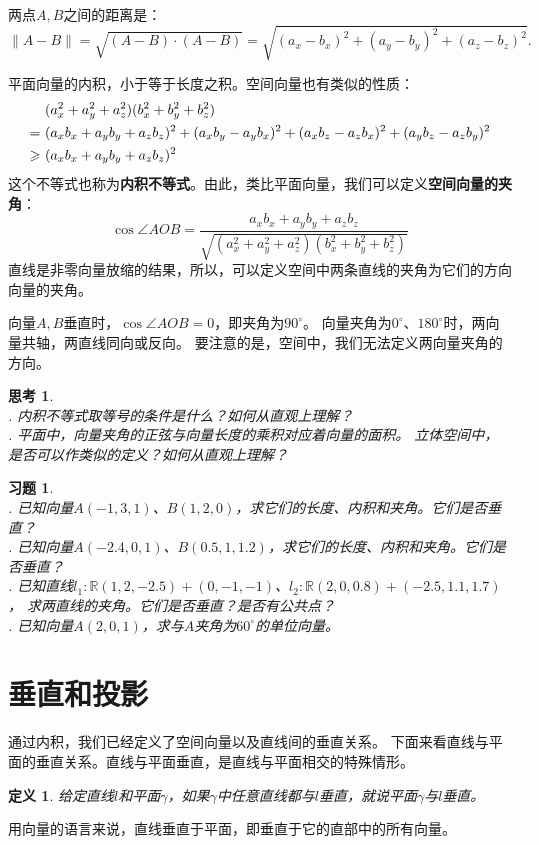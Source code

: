 \documentclass[12pt,UTF8]{ctexbook}
\newtheorem{df}{定义}[section]
\newtheorem{sk}{思考}[section]
\newtheorem{xt}{习题}[section]
\begin{document}
两点$A,B$之间的距离是：
$$\|A-B\| = \sqrt{(A - B)\cdot(A-B)} = \sqrt{(a_x - b_x)^2 + (a_y-b_y)^2 + (a_z-b_z)^2}. $$

平面向量的内积，小于等于长度之积。空间向量也有类似的性质：
\begin{align}
    &(a_x^2 + a_y^2 + a_z^2)(b_x^2 + b_y^2 + b_z^2) \notag \\
    =\,\,& (a_xb_x + a_yb_y + a_zb_z)^2 + (a_xb_y - a_yb_x)^2 + (a_xb_z - a_zb_x)^2 + (a_yb_z - a_zb_y)^2 \notag \\
    \geqslant\,\,& (a_xb_x + a_yb_y + a_zb_z)^2 \notag 
\end{align}
这个不等式也称为\textbf{内积不等式}。由此，类比平面向量，我们可以定义\textbf{空间向量的夹角}：
$$ \cos \angle AOB = \frac{a_xb_x + a_yb_y + a_zb_z}{\sqrt{(a_x^2 + a_y^2 + a_z^2)(b_x^2 + b_y^2 + b_z^2)}}$$
直线是非零向量放缩的结果，所以，可以定义空间中两条直线的夹角为它们的方向向量的夹角。

向量$A,B$垂直时，$\cos \angle AOB = 0$，即夹角为$90^\circ$。
向量夹角为$0^\circ$、$180^\circ$时，两向量共轴，两直线同向或反向。
要注意的是，空间中，我们无法定义两向量夹角的方向。

\begin{sk}
    \mbox{} \\
    . 内积不等式取等号的条件是什么？如何从直观上理解？\\
    . 平面中，向量夹角的正弦与向量长度的乘积对应着向量的面积。
    立体空间中，是否可以作类似的定义？如何从直观上理解？
\end{sk}

\begin{xt}
    \mbox{} \\
    . 已知向量$A(-1, 3, 1)$、$B(1, 2, 0)$，求它们的长度、内积和夹角。它们是否垂直？\\
    . 已知向量$A(-2.4, 0, 1)$、$B(0.5, 1, 1.2)$，求它们的长度、内积和夹角。它们是否垂直？\\
    . 已知直线$l_1: \mathbb{R}(1,2,-2.5) + (0,-1,-1)$、$l_2: \mathbb{R}(2,0,0.8) + (-2.5,1.1,1.7)$，
    求两直线的夹角。它们是否垂直？是否有公共点？\\
    . 已知向量$A(2, 0, 1)$，求与$A$夹角为$60^\circ$的单位向量。
\end{xt}

\section{垂直和投影}

通过内积，我们已经定义了空间向量以及直线间的垂直关系。
下面来看直线与平面的垂直关系。直线与平面垂直，是直线与平面相交的特殊情形。
\begin{df}\label{df:1-3-10}
    给定直线$l$和平面$\gamma$，如果$\gamma$中任意直线都与$l$垂直，就说平面$\gamma$与$l$垂直。
\end{df}
用向量的语言来说，直线垂直于平面，即垂直于它的直部中的所有向量。
\end{document}
